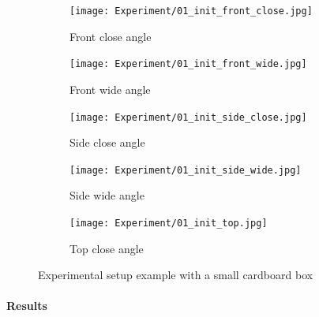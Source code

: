 \begin{figure}[H]

\begin{subfigure}{0.20\textwidth}
\texttt{[image: Experiment/01\_init\_front\_close.jpg]}
\caption{Front close angle} \label{fig:01_init_front_close}
\end{subfigure}\hspace*{\fill}
\begin{subfigure}{0.20\textwidth}
\texttt{[image: Experiment/01\_init\_front\_wide.jpg]}
\caption{Front wide angle} \label{fig:01_init_front_wide}
\end{subfigure}\hspace*{\fill}
\begin{subfigure}{0.20\textwidth}
\texttt{[image: Experiment/01\_init\_side\_close.jpg]}
\caption{Side close angle} \label{fig:01_init_side_close}
\end{subfigure}

\medskip

\begin{subfigure}{0.35\textwidth}
\texttt{[image: Experiment/01\_init\_side\_wide.jpg]}
\caption{Side wide angle} \label{fig:01_init_side_wide}
\end{subfigure}\hspace*{\fill}
\begin{subfigure}{0.35\textwidth}
\texttt{[image: Experiment/01\_init\_top.jpg]}
\caption{Top close angle} \label{fig:01_init_top}
\end{subfigure}

\caption{Experimental setup example with a small cardboard box} \label{fig:experimental_setup}
\end{figure}

\paragraph{Results}


